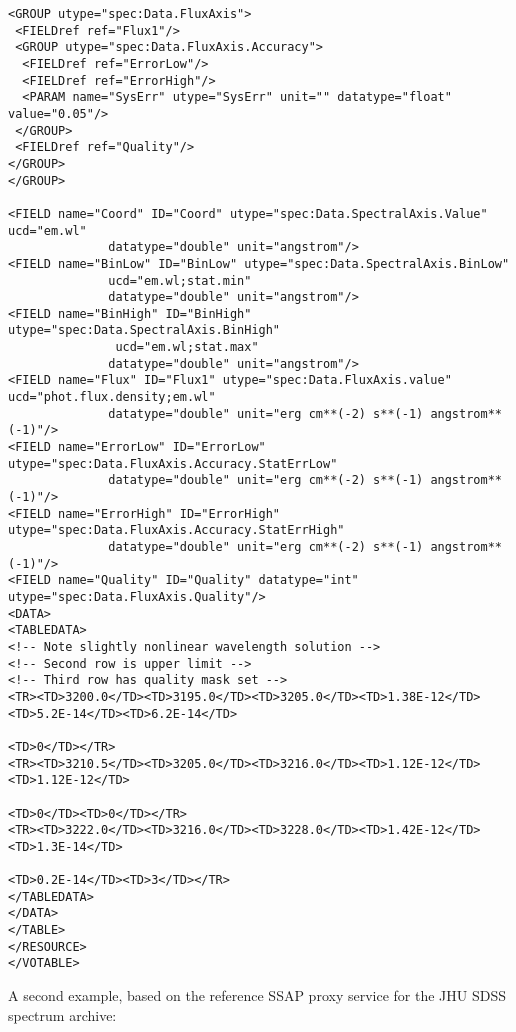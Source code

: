 {\begin{flushleft}
\begin{fmpage}
\begin{verbatim}
\end{verbatim}
\end{fmpage}

\begin{fmpage}
\begin{verbatim}
<GROUP utype="spec:Data.FluxAxis">
 <FIELDref ref="Flux1"/>
 <GROUP utype="spec:Data.FluxAxis.Accuracy">
  <FIELDref ref="ErrorLow"/>
  <FIELDref ref="ErrorHigh"/>
  <PARAM name="SysErr" utype="SysErr" unit="" datatype="float" value="0.05"/>
 </GROUP>
 <FIELDref ref="Quality"/>
</GROUP>
</GROUP>

<FIELD name="Coord" ID="Coord" utype="spec:Data.SpectralAxis.Value" ucd="em.wl"
              datatype="double" unit="angstrom"/>
<FIELD name="BinLow" ID="BinLow" utype="spec:Data.SpectralAxis.BinLow" 
              ucd="em.wl;stat.min"
              datatype="double" unit="angstrom"/>
<FIELD name="BinHigh" ID="BinHigh" utype="spec:Data.SpectralAxis.BinHigh"
               ucd="em.wl;stat.max"
              datatype="double" unit="angstrom"/>
<FIELD name="Flux" ID="Flux1" utype="spec:Data.FluxAxis.value" ucd="phot.flux.density;em.wl"
              datatype="double" unit="erg cm**(-2) s**(-1) angstrom**(-1)"/>
<FIELD name="ErrorLow" ID="ErrorLow" utype="spec:Data.FluxAxis.Accuracy.StatErrLow" 
              datatype="double" unit="erg cm**(-2) s**(-1) angstrom**(-1)"/>
<FIELD name="ErrorHigh" ID="ErrorHigh" utype="spec:Data.FluxAxis.Accuracy.StatErrHigh" 
              datatype="double" unit="erg cm**(-2) s**(-1) angstrom**(-1)"/>
<FIELD name="Quality" ID="Quality" datatype="int" utype="spec:Data.FluxAxis.Quality"/>
<DATA>
<TABLEDATA>
<!-- Note slightly nonlinear wavelength solution -->
<!-- Second row is upper limit -->
<!-- Third row has quality mask set -->
<TR><TD>3200.0</TD><TD>3195.0</TD><TD>3205.0</TD><TD>1.38E-12</TD><TD>5.2E-14</TD><TD>6.2E-14</TD>
                                                                                    <TD>0</TD></TR>
<TR><TD>3210.5</TD><TD>3205.0</TD><TD>3216.0</TD><TD>1.12E-12</TD><TD>1.12E-12</TD>
                                                                     <TD>0</TD><TD>0</TD></TR>
<TR><TD>3222.0</TD><TD>3216.0</TD><TD>3228.0</TD><TD>1.42E-12</TD><TD>1.3E-14</TD>
                                                                     <TD>0.2E-14</TD><TD>3</TD></TR>
</TABLEDATA>
</DATA>
</TABLE>
</RESOURCE>
</VOTABLE>

\end{verbatim}
\end{fmpage}

\end{flushleft}
}

A second example, based on the reference SSAP proxy service for
the JHU SDSS spectrum archive:


